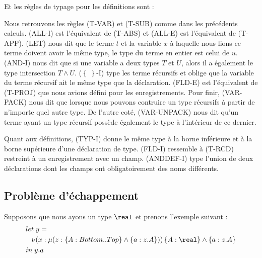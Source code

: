 Et les règles de typage pour les définitions sont :


Nous retrouvons les règles (T-VAR) et (T-SUB) comme dans les précédents calculs.
(ALL-I) est l'équivalent de (T-ABS) et (ALL-E) est l'équivalent de (T-APP).
(LET) nous dit que le terme $t$ et la variable $x$ à laquelle nous lions ce
terme doivent avoir le même type, le type du terme en entier est celui de $u$.
(AND-I) nous dit que si une variable a deux types $T$ et $U$, alors il a
également le type intersection $T \wedge U$. ($\left\{ \; \right\}$-I) type les terme
récursifs et oblige que la variable du terme récursif ait le même type que la déclaration.
(FLD-E) est l'équivalent de (T-PROJ) que nous avions défini pour les
enregistrements.
Pour finir, (VAR-PACK) nous dit que lorsque nous pouvons
contruire un type récursifs à partir de n'importe quel autre type. De l'autre
coté, (VAR-UNPACK) nous dit qu'un terme ayant un type récursif possède également
le type à l'intérieur de ce dernier.

Quant aux définitions, (TYP-I) donne le même type à la borne inférieure et à la
borne supérieure d'une déclaration de type. (FLD-I) ressemble à (T-RCD)
restreint à un enregistrement avec un champ. (ANDDEF-I) type l'union de deux
déclarations dont les champs ont obligatoirement des noms différents.

\subsection*{Problème d'échappement}

Supposons que nous ayons un type $\real$ et prenons l'exemple suivant :
\begin{align*}
  & let \; y = \\
  &\; \; \; \nu(x : \mu(z : \left\{ A : Bottom .. Top \right\} \wedge \left\{ a : z.A \right\})) \left\{ A : \real \right\} \wedge \left\{ a : z.A \right\} \\
  & in \; y.a
\end{align*}

